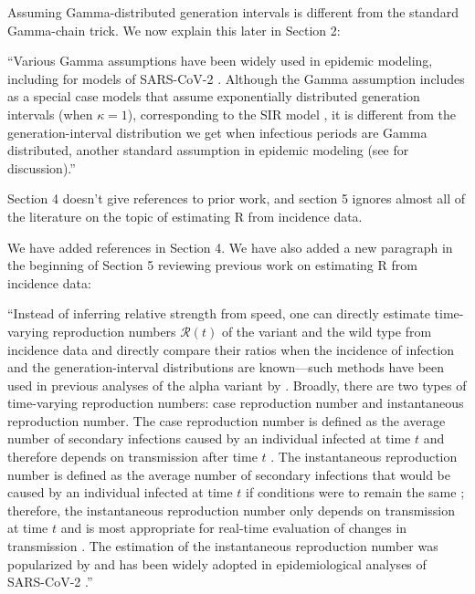 \documentclass[12pt]{article}
\newcommand{\RR}{\ensuremath{{\mathcal R}}\xspace}
\newcommand{\revtext}{\textsf}
\begin{document}
Assuming Gamma-distributed generation intervals is different from the standard Gamma-chain trick. We now explain this later in Section 2:

``Various Gamma assumptions have been widely used in epidemic modeling, including for models of SARS-CoV-2 \citep{doi:10.1098/rsif.2020.0144}.
Although the Gamma assumption includes as a special case models that assume exponentially distributed generation intervals (when $\kappa=1$), corresponding to the SIR model \citep{anderson1991infectious}, it is different from the generation-interval distribution we get when infectious periods are Gamma distributed, another standard assumption in epidemic modeling (see \cite{roberts2007model} for discussion).''

\revtext{Section 4 doesn't give references to prior work, and section 5 ignores almost all of the literature on the topic of estimating R from incidence data.}

We have added references in Section 4.
We have also added a new paragraph in the beginning of Section 5 reviewing previous work on estimating R from incidence data:

``Instead of inferring relative strength from speed, one can directly estimate time-varying reproduction numbers $\RR(t)$ of the variant and the wild type from incidence data and directly compare their ratios when the incidence of infection and the generation-interval distributions are known---such methods have been used in previous analyses of the alpha variant by \cite{volz2021transmission}.
Broadly, there are two types of time-varying reproduction numbers: case reproduction number and instantaneous reproduction number.
The case reproduction number is defined as the average number of secondary infections caused by an individual infected at time $t$ and therefore depends on transmission after time $t$ \citep{wallinga2004different}.
The instantaneous reproduction number is defined as the average number of secondary infections that would be caused by an individual infected at time $t$ if conditions were to remain the same \citep{fraser2007estimating}; 
therefore, the instantaneous reproduction number only depends on transmission at time $t$ and is most appropriate for real-time evaluation of changes in transmission \citep{gostic2020practical}.
The estimation of the instantaneous reproduction number was popularized by \cite{cori2013new} and has been widely adopted in epidemiological analyses of SARS-CoV-2 \citep{abbott2020estimating,knight2020estimating,flaxman2020Rt,brauner2021inferring,li2021temporal}.''
\end{document}
